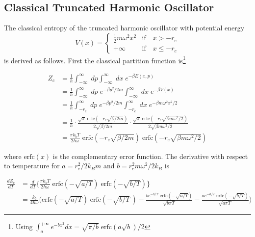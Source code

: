 \documentclass[../main.tex]{subfiles}
\begin{document}
\subsection{Classical Truncated Harmonic Oscillator}

The classical entropy of the truncated harmonic oscillator with potential energy 
\begin{equation}
	V(x) = \begin{cases}
		\frac{1}{2}m\omega^2x^2 &\text{if} \quad x > -r_e \\
		+\infty &\text{if} \quad x \le -r_e
	\end{cases} 
\end{equation}
is derived as follows. First the classical partition function is\footnote{Using $\int_{a}^{+\infty}  e^{-bx^2} dx = \sqrt{\pi/b}\;\text{erfc}(a\sqrt{b})/2$}

\begin{equation}
	\begin{aligned}
		Z_c &= \frac{1}{h}\int_{-\infty}^\infty \; dp\int_{-\infty}^{\infty} \; dx \; e^{-\beta E(x,p)} \\
		&= \frac{1}{h}\int_{-\infty}^\infty \; dp \; e^{-\beta p^2/2m} \int_{-\infty}^{\infty} \; dx \; e^{-\beta V(x)} \\
		&= \frac{1}{h}\int_{-r_e}^\infty \; dp \; e^{-\beta p^2/2m} \int_{-r_e}^{\infty} \; dx \; e^{-\beta m\omega^2x^2/2} \\
		&=\frac{1}{h}\cdot \frac{\sqrt{\pi}\;\text{erfc}(-r_e \sqrt{\beta/2m})}{2\sqrt{\beta/2m}}\cdot \frac{\sqrt{\pi}\;\text{erfc}(-r_e \sqrt{\beta m\omega^2/2})}{2\sqrt{\beta m\omega^2/2}} \\
		&=\frac{\pi k_b T}{2h\omega} \;\text{erfc}(-r_e \sqrt{\beta/2m})\;\text{erfc}(-r_e \sqrt{\beta m\omega^2/2})
	\end{aligned}
\end{equation}

where $\text{erfc}(x)$ is the complementary error function. The derivative with respect to temperature for $a = r_e^2/ 2k_B m$ and $b = r_e^2m\omega^2/2k_B$ is 

\begin{equation}
	\begin{aligned}
		\frac{d Z_c}{dT} &= \frac{d}{dT} {\Big \{} \frac{\pi k_b T}{2h\omega} \;\text{erfc}(- \sqrt{a/T})\;\text{erfc}(- \sqrt{b/T}) {\Big \}} \\
		&= \frac{ k_b}{4\hbar\omega} {\Bigg (} \text{erfc}(- \sqrt{a/T})\;\text{erfc}(- \sqrt{b/T}\,) - \frac{b e^{-b/T} \; \text{erfc}(-\sqrt{a/T})}{\sqrt{b\pi T}} - \frac{a e^{-a/T} \; \text{erfc}(-\sqrt{b/T})}{\sqrt{a\pi T}} {\Bigg )}
	\end{aligned}
\end{equation}
\end{document}
